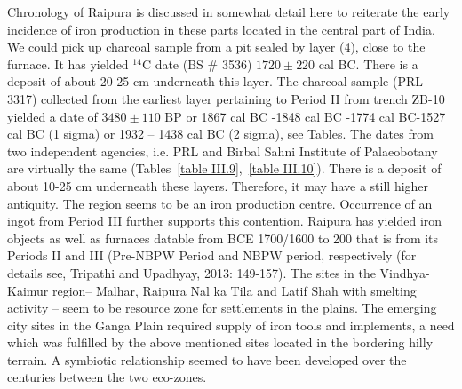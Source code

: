 Chronology of Raipura is discussed in somewhat detail here to reiterate the early incidence of iron production in these parts located in the central part of India. We could pick up charcoal sample from a pit sealed by layer (4), close to the furnace. It has yielded ${}^{14}$C date (BS \# 3536) $1720 \pm 220$ cal BC. There is a deposit of about 20-25 cm underneath this layer. The charcoal sample (PRL 3317) collected from the earliest layer pertaining to Period II from trench ZB-10 yielded a date of $3480\pm110$ BP or 1867 cal BC -1848 cal BC -1774 cal BC-1527 cal BC (1 sigma) or 1932 – 1438 cal BC (2 sigma), see Tables. The dates from two independent agencies, i.e. PRL and Birbal Sahni Institute of Palaeobotany are virtually the same (Tables~\ref{table III.9},~\ref{table III.10}). There is a deposit of about 10-25 cm underneath these layers. Therefore, it may have a still higher antiquity. The region seems to be an iron production centre. Occurrence of an ingot from Period III further supports this contention. Raipura has yielded iron objects as well as furnaces datable from BCE 1700/1600 to 200 that is from its Periods II and III (Pre-NBPW Period and NBPW period, respectively (for details see, Tripathi and Upadhyay, 2013: 149-157). The sites in the Vindhya-Kaimur region– Malhar, Raipura Nal ka Tila and Latif Shah with smelting activity – seem to be resource zone for settlements in the plains. The emerging city sites in the Ganga Plain required supply of iron tools and implements, a need which was fulfilled by the above mentioned sites located in the bordering hilly terrain. A symbiotic relationship seemed to have been developed over the centuries between the two eco-zones. 

